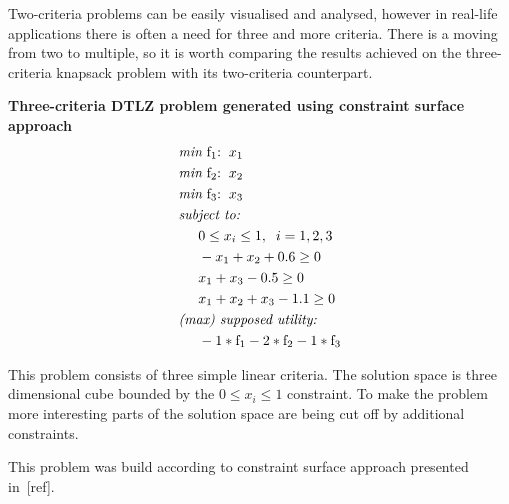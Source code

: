 \begin{description}
    Two-criteria problems can be easily visualised and analysed, however in
    real-life applications there is often a need for three and more
    criteria. There is a moving from two to multiple, so it is worth comparing
    the results achieved on the three-criteria knapsack problem with its
    two-criteria counterpart. 

  \item{\textbf{Three-criteria DTLZ problem generated using constraint surface
    approach}}
    \begin{align*}
      & \textit{min}\text{ f$_1$:} \hspace{0.2cm} x_1 \\
      & \textit{min}\text{ f$_2$:} \hspace{0.2cm} x_2 \\
      & \textit{min}\text{ f$_3$:} \hspace{0.2cm} x_3 \\
      & \textit{subject to:} \\
      & \hspace{0.5cm} 0 \le x_i \le 1, \hspace{0.2cm} i = 1, 2, 3 \\
      & \hspace{0.5cm} -x_1 + x_2 + 0.6 \ge 0 \\
      & \hspace{0.5cm} x_1 + x_3 - 0.5 \ge 0 \\
      & \hspace{0.5cm} x_1 + x_2 + x_3 - 1.1 \ge 0 \\
      & \textit{(max) supposed utility:} \\
      & \hspace{0.5cm} -1 * \text{f}_1 - 2 * \text{f}_2 - 1 * \text{f}_3
    \end{align*}

    This problem consists of three simple linear criteria. The solution space
    is three dimensional cube bounded by the $0 \le x_i \le 1$ constraint. To
    make the problem more interesting parts of the solution space are being
    cut off by additional constraints.

    This problem was build according to constraint surface approach presented
    in~[ref].


\end{description}
